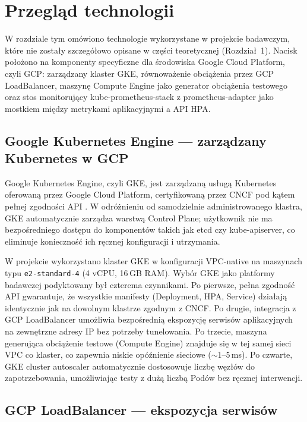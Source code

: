 \chapter{Przegląd technologii}

W rozdziale tym omówiono technologie wykorzystane w projekcie badawczym, które nie zostały szczegółowo opisane w części teoretycznej (Rozdział~1). Nacisk położono na komponenty specyficzne dla środowiska Google Cloud Platform, czyli GCP: zarządzany klaster GKE, równoważenie obciążenia przez GCP LoadBalancer, maszynę Compute Engine jako generator obciążenia testowego oraz stos monitorujący kube-prometheus-stack z prometheus-adapter jako mostkiem między metrykami aplikacyjnymi a API HPA.

\section{Google Kubernetes Engine — zarządzany Kubernetes w GCP}

Google Kubernetes Engine, czyli GKE, jest zarządzaną usługą Kubernetes oferowaną przez Google Cloud Platform, certyfikowaną przez CNCF pod kątem pełnej zgodności API \cite{gke-docs}. W odróżnieniu od samodzielnie administrowanego klastra, GKE automatycznie zarządza warstwą Control Plane; użytkownik nie ma bezpośredniego dostępu do komponentów takich jak etcd czy kube-apiserver, co eliminuje konieczność ich ręcznej konfiguracji i utrzymania.

W projekcie wykorzystano klaster GKE w konfiguracji VPC-native na maszynach typu \texttt{e2-standard-4} (4 vCPU, 16\,GB RAM). Wybór GKE jako platformy badawczej podyktowany był czterema czynnikami. Po pierwsze, pełna zgodność API gwarantuje, że wszystkie manifesty (Deployment, HPA, Service) działają identycznie jak na dowolnym klastrze zgodnym z CNCF. Po drugie, integracja z GCP LoadBalancer umożliwia bezpośrednią ekspozycję serwisów aplikacyjnych na zewnętrzne adresy IP bez potrzeby tunelowania. Po trzecie, maszyna generująca obciążenie testowe (Compute Engine) znajduje się w tej samej sieci VPC co klaster, co zapewnia niskie opóźnienie sieciowe ($\sim$1--5\,ms). Po czwarte, GKE cluster autoscaler automatycznie dostosowuje liczbę węzłów do zapotrzebowania, umożliwiając testy z dużą liczbą Podów bez ręcznej interwencji.

\section{GCP LoadBalancer — ekspozycja serwisów}

